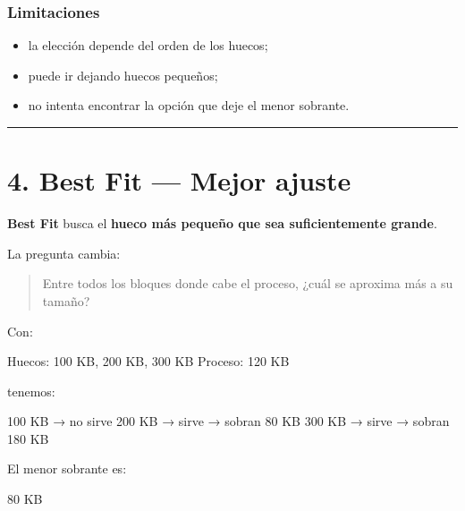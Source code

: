 \documentclass[
  spanish,
  letterpaper,
]{scrbook}
\newenvironment{Shaded}{\begin{snugshade}}{\end{snugshade}}
\newcommand{\NormalTok}[1]{\textcolor[rgb]{0.00,0.23,0.31}{#1}}
\providecommand{\tightlist}{%
  \setlength{\itemsep}{0pt}\setlength{\parskip}{0pt}}
\begin{document}
\subsection{Limitaciones}\label{limitaciones-5}

\begin{itemize}
\tightlist
\item
  la elección depende del orden de los huecos;
\item
  puede ir dejando huecos pequeños;
\item
  no intenta encontrar la opción que deje el menor sobrante.
\end{itemize}

\begin{center}\rule{0.5\linewidth}{0.5pt}\end{center}


\chapter{4. Best Fit --- Mejor ajuste}\label{best-fit-mejor-ajuste-1}

\textbf{Best Fit} busca el \textbf{hueco más pequeño que sea
suficientemente grande}.

La pregunta cambia:

\begin{quote}
Entre todos los bloques donde cabe el proceso, ¿cuál se aproxima más a
su tamaño?
\end{quote}

Con:

\begin{Shaded}
\begin{Highlighting}[]
\NormalTok{Huecos: 100 KB, 200 KB, 300 KB}
\NormalTok{Proceso: 120 KB}
\end{Highlighting}
\end{Shaded}

tenemos:

\begin{Shaded}
\begin{Highlighting}[]
\NormalTok{100 KB → no sirve}
\NormalTok{200 KB → sirve → sobran 80 KB}
\NormalTok{300 KB → sirve → sobran 180 KB}
\end{Highlighting}
\end{Shaded}

El menor sobrante es:

\begin{Shaded}
\begin{Highlighting}[]
\NormalTok{80 KB}
\end{Highlighting}
\end{Shaded}
\end{document}
